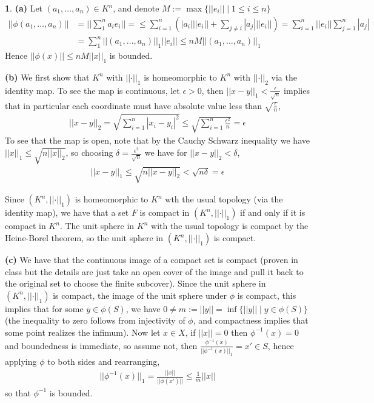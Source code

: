\documentclass[10.5pt]{article}
\theoremstyle{definition}
\newtheorem{pb}{}
\newcommand{\set}[1]{\{#1\}}
\newcommand{\abs}[1]{\left\vert#1\right\vert}
\newcommand{\norm}[1]{\lvert\lvert#1\rvert\rvert}
\begin{document}
    \begin{pb}
        \textbf{(a)} Let \((a_1,\hdots,a_n) \in K^n\), and denote \(M := \max\set{\norm{e_i} \mid 1 \leq i \leq n}\)
        \begin{align*}
            \norm{\phi(a_1,\hdots,a_n)} &= \norm{\sum_1^n a_i e_i} = \leq \sum_{i=1}^n \left(\abs{a_i}\norm{e_i} + \sum_{j\neq i}\abs{a_j}\norm{e_i}\right)
            = \sum_{i=1}^n \norm{e_i}\sum_{j=1}^n \abs{a_j}\\ 
            &= \sum_1^n \norm{(a_1,\hdots,a_n)}_1\norm{e_i} \leq nM\norm{(a_1,\hdots,a_n)}_1
        \end{align*}
        Hence \(\norm{\phi(x)} \leq nM\norm{x}_1\) is bounded.

        \textbf{(b)} We first show that \(K^n\) with \(\norm{\cdot}_1\) is homeomorphic to \(K^n\) with \(\norm{\cdot}_2\) via the identity map. To see the map is continuous, let \(\epsilon > 0\), then \(\norm{x-y}_1 < \frac{\epsilon}{\sqrt{n}}\) implies that in particular each coordinate must have absolute value less than \(\sqrt{\frac{\epsilon}{n}}\),
        \begin{align*}
            \norm{x-y}_2 = \sqrt{\sum_{i=1}^n \abs{x_i - y_i}^2} \leq \sqrt{\sum_{i=1}^n \frac{\epsilon^2}{n}} = \epsilon
        \end{align*}
        To see that the map is open, note that by the Cauchy Schwarz inequality we have \(\norm{x}_1 \leq \sqrt{n\norm{x}_2}\), so choosing \(\delta = \frac{\epsilon^2}{\sqrt{n}}\) we have for \(\norm{x-y}_2 < \delta\),
        \begin{align*}
            \norm{x-y}_1 \leq \sqrt{n\norm{x-y}_2} < \sqrt{n\delta} = \epsilon
        \end{align*}

        Since \((K^n,\norm{\cdot}_1)\) is homeomorphic to \(K^n\) wth the usual topology (via the identity map), we have that a set \(F\) is compact in \((K^n,\norm{\cdot}_1)\) if and only if it is compact in \(K^n\). The unit sphere in \(K^n\) with the usual topology is compact by the Heine-Borel theorem, so the unit sphere in \((K^n,\norm{\cdot}_1)\) is compact.

        \textbf{(c)} We have that the continuous image of a compact set is compact (proven in class but the details are just take an open cover of the image and pull it back to the original set to choose the finite subcover). Since the unit sphere in \((K^n,\norm{\cdot}_1)\) is compact, the image of the unit sphere under \(\phi\) is compact, this implies that for some \(y \in \phi(S)\), we have \(0 \neq m := \norm{y} = \inf\set{\norm{y} \mid y \in \phi(S)}\) (the inequality to zero follows from injectivity of \(\phi\), and compactness implies that some point realizes the infimum). Now let \(x \in X\), if \(\norm{x} = 0\) then \(\phi^{-1}(x) = 0\) and boundedness is immediate, so assume not, then \(\frac{\phi^{-1}(x)}{\norm{\phi^{-1}(x)}_1} = x' \in S\), hence applying \(\phi\) to both sides and rearranging,
        \begin{align*}
            \norm{\phi^{-1}(x)}_1 = \frac{\norm{x}}{\norm{\phi(x')}} \leq \frac{1}{m}\norm{x}
        \end{align*}
        so that \(\phi^{-1}\) is bounded.


\end{pb}
\end{document}
